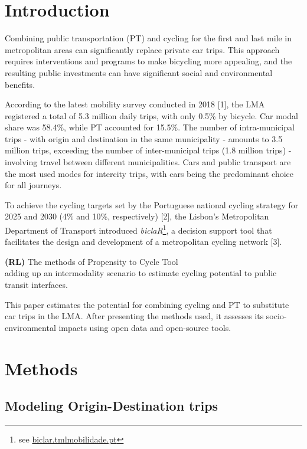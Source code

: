 \documentclass[runningheads]{llncs}
\begin{document}
\hypertarget{introduction}{%
\section{Introduction}\label{introduction}}

Combining public transportation (PT) and cycling for the first and last
mile in metropolitan areas can significantly replace private car trips.
This approach requires interventions and programs to make bicycling more
appealing, and the resulting public investments can have significant
social and environmental benefits.

According to the latest mobility survey conducted in 2018 {[}1{]}, the
LMA registered a total of 5.3 million daily trips, with only 0.5\% by
bicycle. Car modal share was 58.4\%, while PT accounted for 15.5\%. The
number of intra-municipal trips - with origin and destination in the
same municipality - amounts to 3.5 million trips, exceeding the number
of inter-municipal trips (1.8 million trips) - involving travel between
different municipalities. Cars and public transport are the most used
modes for intercity trips, with cars being the predominant choice for
all journeys.

To achieve the cycling targets set by the Portuguese national cycling
strategy for 2025 and 2030 (4\% and 10\%, respectively) {[}2{]}, the
Lisbon's Metropolitan Department of Transport introduced
\emph{biclaR}\footnote{see
  \href{https://biclar.tmlmobilidade.pt/}{biclar.tmlmobilidade.pt}}, a
decision support tool that facilitates the design and development of a
metropolitan cycling network {[}3{]}.

\textbf{(RL)} The methods of Propensity to Cycle Tool\\
adding up an intermodality scenario to estimate cycling potential to
public transit interfaces.

This paper estimates the potential for combining cycling and PT to
substitute car trips in the LMA. After presenting the methods used, it
assesses its socio-environmental impacts using open data and open-source
tools.

\hypertarget{methods}{%
\section{Methods}\label{methods}}

\hypertarget{modeling-origin-destination-trips}{%
\subsection{Modeling Origin-Destination
trips}\label{modeling-origin-destination-trips}}
\end{document}
